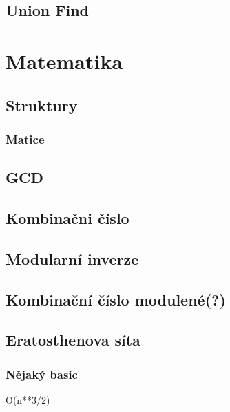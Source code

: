 \documentclass{article}
\begin{document}
\subsection{Union Find}


\newpage

\section{Matematika}

\subsection{Struktury}
\subsubsection{Matice}


\subsection{GCD}


\subsection{Kombinačni číslo}


\subsection{Modularní inverze}


\subsection{Kombinační číslo modulené(?)}


\subsection{Eratosthenova síta}
\subsubsection{Nějaký basic}
O(n**3/2)

\end{document}
